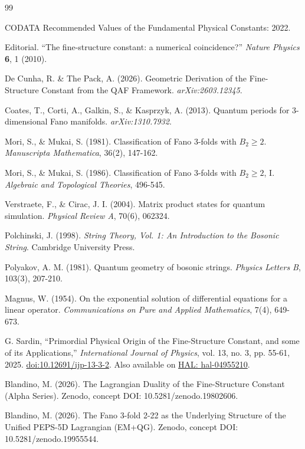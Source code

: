 \documentclass[12pt]{article}
\numberwithin{equation}{section}
\begin{document}

\begin{thebibliography}{99}

CODATA Recommended Values of the Fundamental Physical Constants: 2022.

Editorial. ``The fine-structure constant: a numerical coincidence?'' \textit{Nature Physics} \textbf{6}, 1 (2010).

De Cunha, R. \& The Pack, A. (2026). Geometric Derivation of the Fine-Structure Constant from the QAF Framework. \textit{arXiv:2603.12345}.

Coates, T., Corti, A., Galkin, S., \& Kasprzyk, A. (2013). Quantum periods for 3-dimensional Fano manifolds. \textit{arXiv:1310.7932}.

Mori, S., \& Mukai, S. (1981). Classification of Fano 3-folds with \(B_2 \ge 2\). \textit{Manuscripta Mathematica}, 36(2), 147-162.

Mori, S., \& Mukai, S. (1986). Classification of Fano 3-folds with \(B_2 \ge 2\), I. \textit{Algebraic and Topological Theories}, 496-545.

Verstraete, F., \& Cirac, J. I. (2004). Matrix product states for quantum simulation. \textit{Physical Review A}, 70(6), 062324.

Polchinski, J. (1998). \textit{String Theory, Vol. 1: An Introduction to the Bosonic String}. Cambridge University Press.

Polyakov, A. M. (1981). Quantum geometry of bosonic strings. \textit{Physics Letters B}, 103(3), 207-210.

Magnus, W. (1954). On the exponential solution of differential equations for a linear operator. \textit{Communications on Pure and Applied Mathematics}, 7(4), 649-673.

G. Sardin,
``Primordial Physical Origin of the Fine-Structure Constant, and some of its Applications,''
\textit{International Journal of Physics},
vol. 13, no. 3, pp. 55-61, 2025.
\href{https://doi.org/10.12691/ijp-13-3-2}{doi:10.12691/ijp-13-3-2}.
Also available on \href{https://hal.science/hal-04955210}{HAL: hal-04955210}.

Blandino, M. (2026). The Lagrangian Duality of the Fine-Structure Constant (Alpha Series). Zenodo, concept DOI: 10.5281/zenodo.19802606.

Blandino, M. (2026). The Fano 3-fold 2-22 as the Underlying Structure of the Unified PEPS-5D Lagrangian (EM+QG). Zenodo, concept DOI: 10.5281/zenodo.19955544.

\end{thebibliography}
\end{document}
